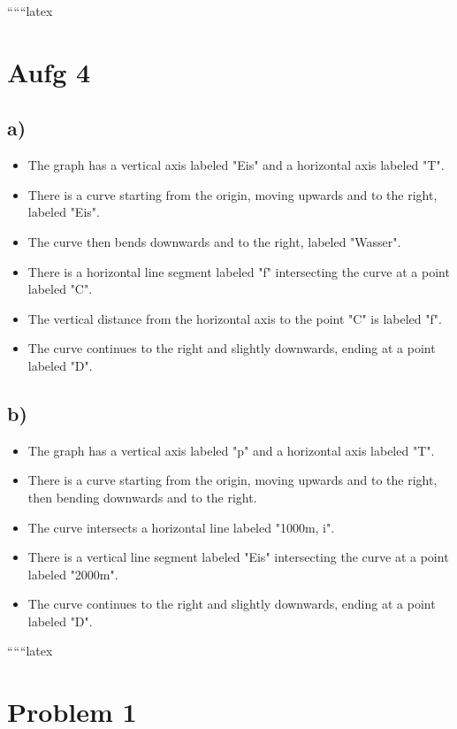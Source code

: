 
``````latex


\section*{Aufg 4}

\subsection*{a)}

\begin{itemize}
    \item The graph has a vertical axis labeled "Eis" and a horizontal axis labeled "T".
    \item There is a curve starting from the origin, moving upwards and to the right, labeled "Eis".
    \item The curve then bends downwards and to the right, labeled "Wasser".
    \item There is a horizontal line segment labeled "f" intersecting the curve at a point labeled "C".
    \item The vertical distance from the horizontal axis to the point "C" is labeled "f".
    \item The curve continues to the right and slightly downwards, ending at a point labeled "D".
\end{itemize}

\subsection*{b)}

\begin{itemize}
    \item The graph has a vertical axis labeled "p" and a horizontal axis labeled "T".
    \item There is a curve starting from the origin, moving upwards and to the right, then bending downwards and to the right.
    \item The curve intersects a horizontal line labeled "1000m, i".
    \item There is a vertical line segment labeled "Eis" intersecting the curve at a point labeled "2000m".
    \item The curve continues to the right and slightly downwards, ending at a point labeled "D".
\end{itemize}

``````latex


\section*{Problem 1}

